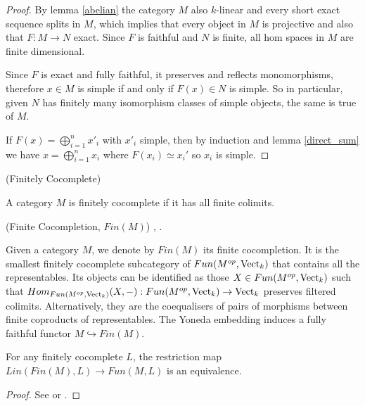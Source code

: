 \begin{proof}
  By lemma \ref{abelian} the category $M$ also $k$-linear and every short
  exact sequence splits in $M$, which implies that every object in $M$ is
  projective and also that $F:M\to N$ exact. Since $F$ is faithful and $N$ is
  finite, all hom spaces in $M$ are finite dimensional.

  Since $F$ is exact and fully faithful, it preserves and reflects
  monomorphisms, therefore $x\in M$ is simple if and only if $F(x)\in N$ is
  simple. So in particular, given $N$ has finitely many isomorphism classes of
  simple objects, the same is true of $M$.

  If $F(x)=\bigoplus_{i=1}^n x'_i$ with $x'_i$ simple, then by induction and
  lemma \ref{direct_sum} we have $x=\bigoplus_{i=1}^n x_i$ where
  $F(x_i)\simeq x_i'$ so $x_i$ is simple.
\end{proof}

\begin{definition}\label{definition/finitely-cocomplete} (Finitely Cocomplete)

  \noindent A category $M$ is finitely cocomplete if it has all finite colimits.
\end{definition}


\begin{definition} \label{definition/finite-cocompletion}
  (Finite Cocompletion, $Fin(M)$) \cite[Section 5.7]{kelly/basic-concepts-enriched}, \cite[Section 2.2.1]{lopezfranco/tensor-products}.

  \noindent Given a category $M$, we denote by $Fin(M)$ its finite
  cocompletion. It is the smallest finitely cocomplete subcategory of
  $Fun(M^{op},\operatorname{Vect}_k)$ that contains all the representables. Its objects can
  be identified as those $X\in Fun(M^{op},\operatorname{Vect}_k)$ such that
  $Hom_{Fun(M^{op},\operatorname{Vect}_k)}(X,-):Fun(M^{op},\operatorname{Vect}_k)\to \operatorname{Vect}_k$ preserves
  filtered colimits. Alternatively, they are the coequalisers of pairs of
  morphisms between finite coproducts of representables. The Yoneda embedding
  induces a fully faithful functor $M\hookrightarrow Fin(M)$.
\end{definition}

\begin{lemma}\label{univ_prop_fin}

  \noindent For any finitely cocomplete $L$, the restriction map $Lin(Fin(M),L)\to
  Fun(M,L)$ is an equivalence.
\end{lemma}

\begin{proof}
 See \cite[Section 5.7]{kelly/basic-concepts-enriched} or \cite[Section
   2.2.1]{lopezfranco/tensor-products}.
\end{proof}

